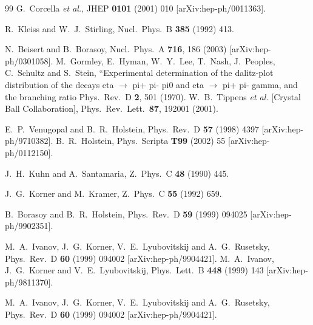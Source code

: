 \documentclass{article}
\begin{document}
\begin{thebibliography}{99}
  G.~Corcella {\it et al.},
  JHEP {\bf 0101} (2001) 010
  [arXiv:hep-ph/0011363].

 R.~Kleiss and W.~J.~Stirling,
Nucl.\ Phys.\  B {\bf 385} (1992) 413.

  N.~Beisert and B.~Borasoy,
  Nucl.\ Phys.\  A {\bf 716}, 186 (2003)
  [arXiv:hep-ph/0301058].
  M.~Gormley, E.~Hyman, W.~Y.~Lee, T.~Nash, J.~Peoples, C.~Schultz and S.~Stein,
   ``Experimental determination of the dalitz-plot distribution of the decays
   eta $\to$ pi+ pi- pi0 and eta $\to$ pi+ pi- gamma, and the branching ratio
  Phys.\ Rev.\  D {\bf 2}, 501 (1970).
  W.~B.~Tippens {\it et al.}  [Crystal Ball Collaboration],
  Phys.\ Rev.\ Lett.\  {\bf 87}, 192001 (2001).

 E.~P.~Venugopal and B.~R.~Holstein,
Phys.\ Rev.\  D {\bf 57} (1998) 4397 [arXiv:hep-ph/9710382].
 B.~R.~Holstein,
 Phys.\ Scripta {\bf T99} (2002) 55 [arXiv:hep-ph/0112150].

 J.~H.~Kuhn and A.~Santamaria,
Z.\ Phys.\  C {\bf 48} (1990) 445.

J.~G.~Korner and M.~Kramer,
Z.\ Phys.\  C {\bf 55} (1992) 659.

B.~Borasoy and B.~R.~Holstein,
Phys.\ Rev.\  D {\bf 59} (1999) 094025 [arXiv:hep-ph/9902351].

M.~A.~Ivanov, J.~G.~Korner, V.~E.~Lyubovitskij and A.~G.~Rusetsky,
Phys.\ Rev.\  D {\bf 60} (1999) 094002
[arXiv:hep-ph/9904421].
M.~A.~Ivanov, J.~G.~Korner and V.~E.~Lyubovitskij,
Phys.\ Lett.\  B {\bf 448} (1999) 143 [arXiv:hep-ph/9811370].

M.~A.~Ivanov, J.~G.~Korner, V.~E.~Lyubovitskij and A.~G.~Rusetsky,
Phys.\ Rev.\  D {\bf 60} (1999) 094002
[arXiv:hep-ph/9904421].

\end{thebibliography}
\end{document}
